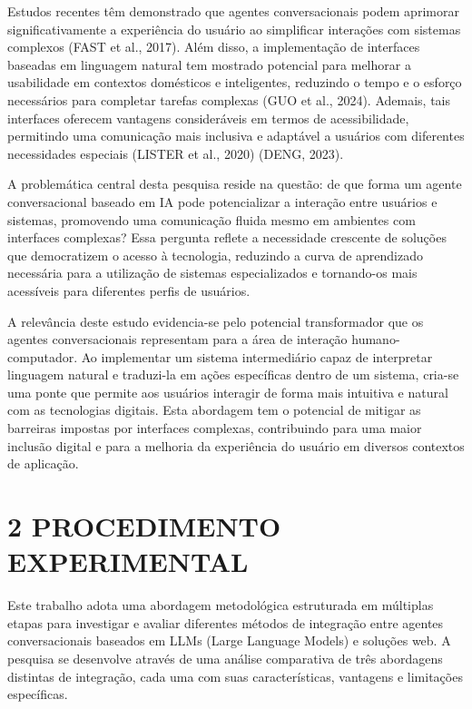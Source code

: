 \documentclass[
]{article}
\begin{document}
Estudos recentes têm demonstrado que agentes conversacionais podem
aprimorar significativamente a experiência do usuário ao simplificar
interações com sistemas complexos (FAST et al., 2017). Além disso, a
implementação de interfaces baseadas em linguagem natural tem mostrado
potencial para melhorar a usabilidade em contextos domésticos e
inteligentes, reduzindo o tempo e o esforço necessários para completar
tarefas complexas (GUO et al., 2024). Ademais, tais interfaces oferecem
vantagens consideráveis em termos de acessibilidade, permitindo uma
comunicação mais inclusiva e adaptável a usuários com diferentes
necessidades especiais (LISTER et al., 2020) (DENG, 2023).

A problemática central desta pesquisa reside na questão: de que forma um
agente conversacional baseado em IA pode potencializar a interação entre
usuários e sistemas, promovendo uma comunicação fluida mesmo em
ambientes com interfaces complexas? Essa pergunta reflete a necessidade
crescente de soluções que democratizem o acesso à tecnologia, reduzindo
a curva de aprendizado necessária para a utilização de sistemas
especializados e tornando-os mais acessíveis para diferentes perfis de
usuários.

A relevância deste estudo evidencia-se pelo potencial transformador que
os agentes conversacionais representam para a área de interação
humano-computador. Ao implementar um sistema intermediário capaz de
interpretar linguagem natural e traduzi-la em ações específicas dentro
de um sistema, cria-se uma ponte que permite aos usuários interagir de
forma mais intuitiva e natural com as tecnologias digitais. Esta
abordagem tem o potencial de mitigar as barreiras impostas por
interfaces complexas, contribuindo para uma maior inclusão digital e
para a melhoria da experiência do usuário em diversos contextos de
aplicação.

\section{2 PROCEDIMENTO EXPERIMENTAL}\label{procedimento-experimental}

Este trabalho adota uma abordagem metodológica estruturada em múltiplas
etapas para investigar e avaliar diferentes métodos de integração entre
agentes conversacionais baseados em LLMs (Large Language Models) e
soluções web. A pesquisa se desenvolve através de uma análise
comparativa de três abordagens distintas de integração, cada uma com
suas características, vantagens e limitações específicas.
\end{document}

